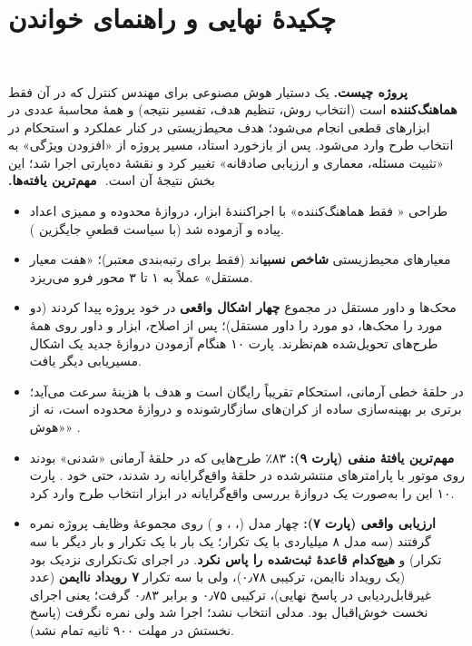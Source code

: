 ‫\documentclass[a4paper,12pt]{article}
\begin{document}
‫\maketitle
‫
‫\section*{چکیدهٔ نهایی و راهنمای خواندن}
‫
‫\textbf{پروژه چیست.} یک دستیار هوش مصنوعی برای مهندس کنترل که در آن  فقط \textbf{هماهنگ‌کننده} است (انتخاب روش، تنظیم هدف، تفسیر نتیجه) و همهٔ محاسبهٔ عددی در ابزارهای قطعی  انجام می‌شود؛ هدف محیط‌زیستی در کنار عملکرد و استحکام در انتخاب طرح  وارد می‌شود. پس از بازخورد استاد، مسیر پروژه از «افزودن ویژگی» به «تثبیت مسئله، معماری و ارزیابی صادقانه» تغییر کرد و نقشهٔ ده‌پارتی اجرا شد؛ این بخش نتیجهٔ آن است.
‫
‫\textbf{مهم‌ترین یافته‌ها.}
‫\begin{itemize}
‫\item طراحی « فقط هماهنگ‌کننده» با اجراکنندهٔ ابزار، دروازهٔ محدوده و ممیزی اعداد پیاده و آزموده شد (با سیاست قطعیِ جایگزین ).
‫\item معیارهای محیط‌زیستی \textbf{شاخص نسبی}اند (فقط برای رتبه‌بندی معتبر)؛ «هفت معیار مستقل» عملاً به ۱ تا ۳ محور فرو می‌ریزد.
‫\item محک‌ها و داور مستقل در مجموع \textbf{چهار اشکال واقعی} در خود پروژه پیدا کردند (دو مورد را محک‌ها، دو مورد را داور مستقل)؛ پس از اصلاح، ابزار و داور روی همهٔ طرح‌های تحویل‌شده هم‌نظرند. پارت ۱۰ هنگام آزمودن دروازهٔ جدید یک اشکال مسیریابی دیگر یافت.
‫\item در حلقهٔ خطی آرمانی، استحکام تقریباً رایگان است و هدف  با هزینهٔ سرعت می‌آید؛ برتری  بر بهینه‌سازی ساده از کران‌های سازگارشونده و دروازهٔ محدوده است، نه از «هوش» .
‫\item \textbf{مهم‌ترین یافتهٔ منفی (پارت ۹):} ۸۳٪ طرح‌هایی که در حلقهٔ آرمانی «شدنی» بودند روی موتور  با پارامترهای منتشرشده در حلقهٔ واقع‌گرایانه رد شدند، حتی  خود . پارت ۱۰ این را به‌صورت یک دروازهٔ بررسی واقع‌گرایانه در ابزار انتخاب طرح وارد کرد.
‫\item \textbf{ارزیابی  واقعی (پارت ۷):} چهار مدل (، ،  و ) روی مجموعهٔ وظایف پروژه نمره گرفتند (سه مدل ۸ میلیاردی با یک تکرار؛  یک بار با یک تکرار و بار دیگر با سه تکرار) و \textbf{هیچ‌کدام قاعدهٔ ثبت‌شده را پاس نکرد}.  در اجرای تک‌تکراری نزدیک بود (یک رویداد ناایمن، ترکیبی ۰٫۷۸)، ولی با سه تکرار \textbf{۷ رویداد ناایمن} (عدد غیرقابل‌ردیابی در پاسخ نهایی)، ترکیبی ۰٫۷۵ و  برابر ۰٫۸۳ گرفت؛ یعنی اجرای نخست خوش‌اقبال بود. مدلی انتخاب نشد؛  اجرا شد ولی نمره نگرفت (پاسخ نخستش در مهلت ۹۰۰ ثانیه تمام نشد).
‫\end{itemize}
\end{document}
